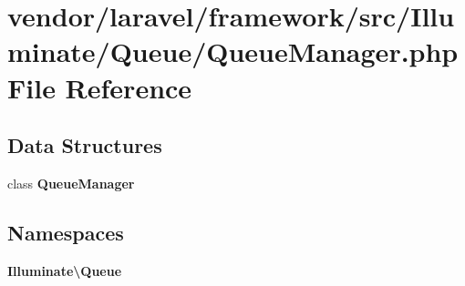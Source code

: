 \section{vendor/laravel/framework/src/\+Illuminate/\+Queue/\+Queue\+Manager.php File Reference}
\label{_queue_manager_8php}
\subsection*{Data Structures}
\begin{DoxyCompactItemize}
\item 
class {\bf Queue\+Manager}
\end{DoxyCompactItemize}
\subsection*{Namespaces}
\begin{DoxyCompactItemize}
\item 
 {\bf Illuminate\textbackslash{}\+Queue}
\end{DoxyCompactItemize}
